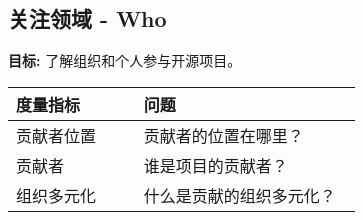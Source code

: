 
    \subsection{关注领域 - Who}
    \textbf{目标:} 了解组织和个人参与开源项目。
    \begin{table}[ht!]
        \centering
        \begin{tabular}{|p{0.35\linewidth} | p{0.6\linewidth}|}
            \hline
            \hfil \textbf{度量指标}  & \hfil \textbf{问题} \\
            \hline
        		贡献者位置 & 贡献者的位置在哪里？ \\ 
		\hline
		贡献者 & 谁是项目的贡献者？ \\ 
		\hline
		组织多元化 & 什么是贡献的组织多元化？ \\ 
		\hline
    \end{tabular}
    \end{table}
        
 
 
 
